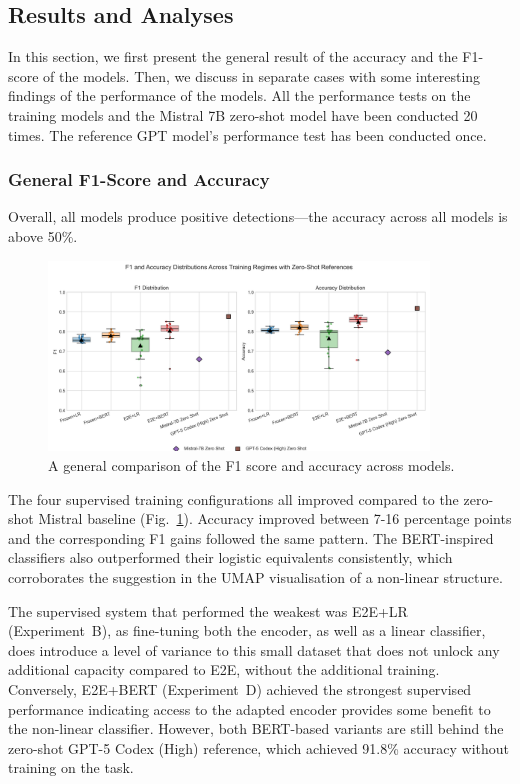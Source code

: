 \documentclass[12pt]{article}
\begin{document}
\subsection{Results and Analyses}
In this section, we first present the general result of the accuracy and the F1-score of the models. Then, we discuss in separate cases with some interesting findings of the performance of the models. All the performance tests on the training models and the Mistral 7B zero-shot model have been conducted 20 times. The reference GPT model's performance test has been conducted once.

\subsubsection{General F1-Score and Accuracy}

Overall, all models produce positive detections\;---\;the accuracy across all models is above 50\%.

\begin{figure}[htbp]
  \centering
  \includegraphics[width=0.9\textwidth]{figures/Accuracy_distribution_4settings.png}
  \caption{A general comparison of the F1 score and accuracy across models.}
  \label{fig:total-comparison}
\end{figure}

The four supervised training configurations all improved compared to the zero-shot Mistral baseline (Fig.~\ref{fig:total-comparison}). Accuracy improved between 7-16 percentage points and the corresponding F1 gains followed the same pattern. The BERT-inspired classifiers also outperformed their logistic equivalents consistently, which corroborates the suggestion in the UMAP visualisation of a non-linear structure.

The supervised system that performed the weakest was E2E+LR (Experiment~B), as fine-tuning both the encoder, as well as a linear classifier, does introduce a level of variance to this small dataset that does not unlock any additional capacity compared to E2E, without the additional training. Conversely, E2E+BERT (Experiment~D) achieved the strongest supervised performance indicating access to the adapted encoder provides some benefit to the non-linear classifier. However, both BERT-based variants are still behind the zero-shot GPT-5 Codex (High) reference, which achieved 91.8\% accuracy without training on the task.
\end{document}
